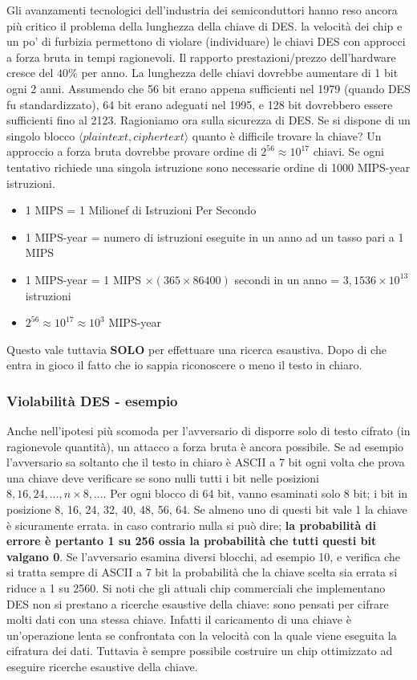 Gli avanzamenti tecnologici dell'industria dei semiconduttori hanno reso ancora più critico il problema della lunghezza della chiave di DES. la velocità dei chip e un po' di furbizia permettono di violare (individuare) le chiavi DES con approcci a forza bruta in tempi ragionevoli. Il rapporto prestazioni/prezzo dell'hardware cresce del
$40\%$ per anno. La lunghezza delle chiavi dovrebbe aumentare di 1 bit ogni 2 anni. Assumendo che 56 bit erano appena sufficienti nel 1979 (quando DES fu standardizzato), 64 bit erano adeguati nel 1995, e 128 bit dovrebbero essere sufficienti fino al 2123. \newline \newline Ragioniamo ora sulla sicurezza di DES. Se si dispone di un singolo blocco $\langle plaintext,ciphertext \rangle$ quanto è difficile trovare la chiave? Un approccio a forza bruta dovrebbe provare ordine di $2^{56} \approx 10^{17}$ chiavi. Se ogni tentativo richiede una singola istruzione sono necessarie ordine di 1000 MIPS-year istruzioni.
\begin{itemize}
  \item 1 MIPS = 1 Milionef di Istruzioni Per Secondo
  \item 1 MIPS-year = numero di istruzioni eseguite in un anno ad un tasso pari a 1 MIPS
  \item 1 MIPS-year = 1 MIPS $\times(365 \times 86400)$ secondi in un anno = $3,1536 \times 10^{13}$ istruzioni
  \item $2^{56} \approx 10^{17} \approx 10^{3}$ MIPS-year
\end{itemize}
Questo vale tuttavia \textbf{SOLO} per effettuare una ricerca esaustiva. Dopo di che entra in gioco il fatto che io sappia riconoscere o meno il testo in chiaro.
\subsubsection{Violabilità DES - esempio}
Anche nell'ipotesi più scomoda per l'avversario di disporre solo di testo cifrato (in ragionevole quantità), un attacco a forza bruta è ancora possibile. Se ad esempio l'avversario sa soltanto che il testo in chiaro è ASCII a 7 bit ogni volta che prova una chiave deve verificare se sono nulli tutti i bit nelle posizioni $8, 16, 24, ..., n \times 8, ...$. Per ogni blocco di 64 bit, vanno esaminati solo 8 bit; i bit in posizione 8, 16, 24, 32, 40, 48, 56, 64. Se almeno uno di questi bit vale 1 la chiave è sicuramente errata. in caso contrario nulla si può dire; \textbf{la probabilità di errore è pertanto 1 su 256 ossia la probabilità che tutti questi bit valgano 0}. Se l'avversario esamina diversi blocchi, ad esempio 10, e verifica che si tratta sempre di ASCII a 7 bit la probabilità che la chiave scelta sia errata si riduce a 1 su 2560. Si noti che gli attuali chip commerciali che implementano DES non si prestano a ricerche esaustive della chiave: sono pensati per cifrare molti dati con una stessa chiave. Infatti il caricamento di una chiave è un'operazione lenta se confrontata con la velocità con la quale viene eseguita la cifratura dei dati. Tuttavia è sempre possibile costruire un chip ottimizzato ad eseguire ricerche esaustive della chiave.

